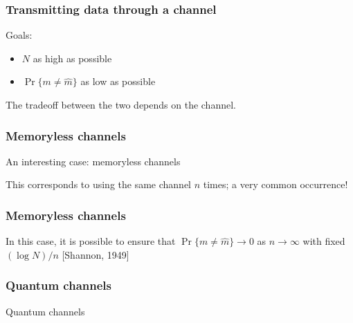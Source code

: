 \documentclass[12pt]{beamer}
\begin{document}
\begin{frame}
\frametitle{Transmitting data through a channel}
    \begin{figure}
    \hspace{-2.3cm}\scalebox{0.8}{}
    \end{figure}
Goals:
\begin{itemize}
\item $N$ as high as possible
\item $\Pr\{ m \neq \hat{m} \}$ as low as possible
\end{itemize}
The tradeoff between the two depends on the channel.
\end{frame}

\begin{frame}
\frametitle{Memoryless channels}
An interesting case: memoryless channels
    \begin{figure}
    \hspace{-2.3cm}\scalebox{0.8}{}
    \end{figure}
This corresponds to using the same channel $n$ times; a very common occurrence!
\end{frame}

\begin{frame}
\frametitle{Memoryless channels}
    \begin{figure}
    \hspace{-2.3cm}\scalebox{0.8}{}
    \end{figure}
In this case, it is possible to ensure that $\Pr\{ m \neq \hat{m} \} \rightarrow 0$ as $n \rightarrow \infty$ with fixed $(\log N)/ n$ [Shannon, 1949]
\end{frame}

\begin{frame}
\frametitle{Quantum channels}
	\begin{center}
		\Huge Quantum channels
	\end{center}
\end{frame}
\end{document}
